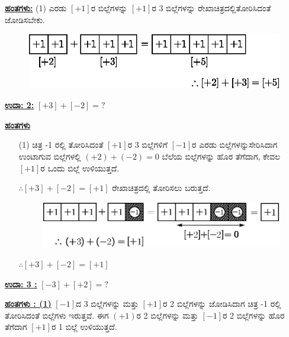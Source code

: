 \noindent
{\textbf{\underline{ಹಂತಗಳು:}}} (1) ಎರಡು $[+1]$ರ ಬಿಲ್ಲೆಗಳನ್ನು $[+1]$ರ 3 ಬಿಲ್ಲೆಗಳನ್ನು ರೇಖಾಚಿತ್ರದಲ್ಲಿ\break ತೋರಿಸಿದಂತೆ ಜೋಡಿಸಬೇಕು.

\begin{figure}[H]
\centering
\includegraphics[scale=0.8]{src/figure/chap3/fig3-8b.eps}
\end{figure}


\noindent
{\textbf{\underline{ಉದಾ: 2:}}} $[+3] + [-2] = ?$

\noindent
{\textbf{\underline{ಹಂತಗಳು}}} 
\begin{itemize}
\item[(1)] ಚಿತ್ರ -1 ರಲ್ಲಿ ತೋರಿಸಿದಂತೆ $[+1]$ರ 3 ಬಿಲ್ಲೆಗಳಿಗೆ $[-1]$ರ ಎರಡು ಬಿಲ್ಲೆಗಳನ್ನು\break ಸೇರಿಸಿದಾಗ ಉಂಟಾಗುವ ಬಿಲ್ಲೆಗಳಲ್ಲಿ $(+2) + (-2) = 0$ ಬೆಲೆಯ ಬಿಲ್ಲೆಗಳನ್ನು ಹೊರ ತೆಗೆದಾಗ, ಕೇವಲ $[+1]$ರ ಒಂದು ಬಿಲ್ಲೆ ಉಳಿಯುತ್ತದೆ.

$\therefore [+3] + [-2] = [+1]$ ರೇಖಾಚಿತ್ರದಲ್ಲಿ ತೋರಿಸಲು ಬರುತ್ತದೆ.
\begin{figure}[H]
\centering
\includegraphics[scale=0.8]{src/figure/chap3/fig3-9b.eps}
\end{figure}

$\therefore [+3] + [-2] = [+1]$
\end{itemize}

\medskip
\noindent
{\textbf{\underline{ಉದಾ: 3 :}}} $[-3] + [+2] = ?$

\noindent
{\textbf{\underline{ಹಂತಗಳು : (1)}}}  $[-1]$ದ 3 ಬಿಲ್ಲೆಗಳನ್ನು ಮತ್ತು $[+1]$ರ 2 ಬಿಲ್ಲೆಗಳನ್ನು ಜೋಡಿಸಿದಾಗ ಚಿತ್ರ -1 ರಲ್ಲಿ ತೋರಿಸಿದಂತೆ ಬಿಲ್ಲೆಗಳು ಇರುತ್ತವೆ. ಈಗ $(+1)$ರ 2 ಬಿಲ್ಲೆಗಳನ್ನು ಮತ್ತು $[-1]$ರ 2 ಬಿಲ್ಲೆಗಳನ್ನು ಹೊರ ತೆಗೆದಾಗ $[+1]$ರ 1 ಬಿಲ್ಲೆ ಉಳಿಯುತ್ತದೆ.

